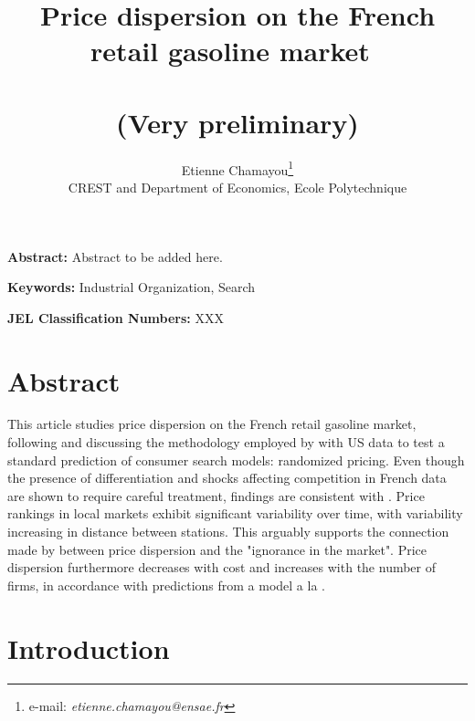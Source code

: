 \documentclass[11pt]{article}
\begin{document}
\title{Price dispersion on the French retail gasoline market\ \\ \ \\(Very preliminary)}
\author{Etienne Chamayou\thanks{e-mail:
\textit{etienne.chamayou@ensae.fr}}\medskip\\{\normalsize CREST and Department of Economics, Ecole Polytechnique}}
\maketitle

\sloppy%

\onehalfspacing

\textbf{Abstract:}
Abstract to be added here.

\strut

\textbf{Keywords:} Industrial Organization, Search

\strut

\textbf{JEL Classification Numbers:} XXX

\pagebreak%
\doublespacing

\section{Abstract}
\setcounter{page}{1}

This article studies price dispersion on the French retail gasoline market, following and discussing the methodology employed by \cite{TAP11} with US data to test a standard prediction of consumer search models: randomized pricing. Even though the presence of differentiation and shocks affecting competition in French data are shown to require careful treatment, findings are consistent with \cite{TAP11}. Price rankings in local markets exhibit significant variability over time, with variability increasing in distance between stations. This arguably supports the connection made by \cite{STI61} between price dispersion and the "ignorance in the market". Price dispersion furthermore decreases with cost and increases with the number of firms, in accordance with predictions from a model a la \cite{VAR80}.

\section{Introduction}
\end{document}
